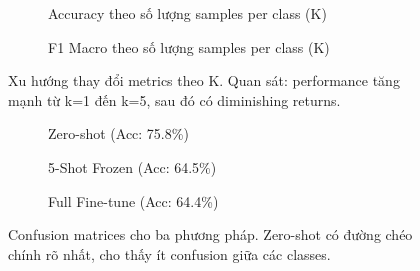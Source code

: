 
\begin{figure}[H]
    \centering
    \begin{subfigure}[b]{0.48\textwidth}
        \centering
        \caption{Accuracy theo số lượng samples per class (K)}
        \label{fig:accuracy-vs-k}
    \end{subfigure}
    \hfill
    \begin{subfigure}[b]{0.48\textwidth}
        \centering
        \caption{F1 Macro theo số lượng samples per class (K)}
        \label{fig:f1-vs-k}
    \end{subfigure}
    \caption{Xu hướng thay đổi metrics theo K. Quan sát: performance tăng mạnh từ k=1 đến k=5, sau đó có diminishing returns.}
    \label{fig:metrics-vs-k}
\end{figure}

\begin{figure}[H]
    \centering
    \begin{subfigure}[b]{0.32\textwidth}
        \centering
        \caption{Zero-shot (Acc: 75.8\%)}
        \label{fig:cm-zeroshot}
    \end{subfigure}
    \hfill
    \begin{subfigure}[b]{0.32\textwidth}
        \centering
        \caption{5-Shot Frozen (Acc: 64.5\%)}
        \label{fig:cm-5shot}
    \end{subfigure}
    \hfill
    \begin{subfigure}[b]{0.32\textwidth}
        \centering
        \caption{Full Fine-tune (Acc: 64.4\%)}
        \label{fig:cm-fullfinetune}
    \end{subfigure}
    \caption{Confusion matrices cho ba phương pháp. Zero-shot có đường chéo chính rõ nhất, cho thấy ít confusion giữa các classes.}
    \label{fig:confusion-matrices}
\end{figure}

